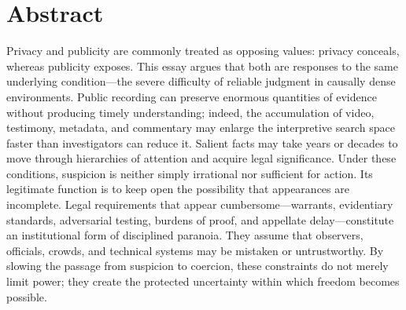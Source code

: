 \chapter*{Abstract}
Privacy and publicity are commonly treated as opposing values: privacy conceals, whereas publicity exposes. This essay argues that both are responses to the same underlying condition---the severe difficulty of reliable judgment in causally dense environments. Public recording can preserve enormous quantities of evidence without producing timely understanding; indeed, the accumulation of video, testimony, metadata, and commentary may enlarge the interpretive search space faster than investigators can reduce it. Salient facts may take years or decades to move through hierarchies of attention and acquire legal significance. Under these conditions, suspicion is neither simply irrational nor sufficient for action. Its legitimate function is to keep open the possibility that appearances are incomplete. Legal requirements that appear cumbersome---warrants, evidentiary standards, adversarial testing, burdens of proof, and appellate delay---constitute an institutional form of disciplined paranoia. They assume that observers, officials, crowds, and technical systems may be mistaken or untrustworthy. By slowing the passage from suspicion to coercion, these constraints do not merely limit power; they create the protected uncertainty within which freedom becomes possible.
